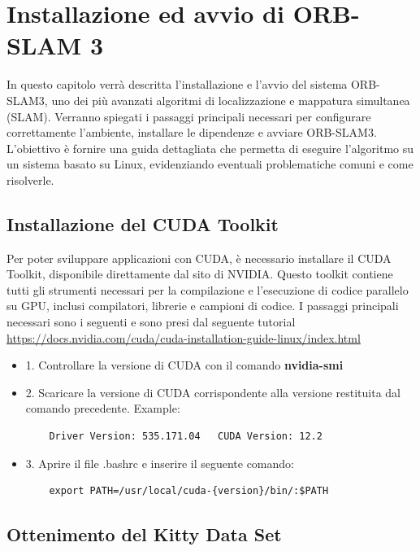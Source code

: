 \documentclass[12pt,a4paper]{report}
\begin{document}
\section{Installazione ed avvio di ORB-SLAM 3}

In questo capitolo verrà descritta l'installazione e l'avvio del sistema ORB-SLAM3, uno dei più avanzati algoritmi di localizzazione e mappatura simultanea (SLAM). Verranno spiegati i passaggi principali necessari per configurare correttamente l'ambiente, installare le dipendenze e avviare ORB-SLAM3. L'obiettivo è fornire una guida dettagliata che permetta di eseguire l'algoritmo su un sistema basato su Linux, evidenziando eventuali problematiche comuni e come risolverle.

\subsection{Installazione del CUDA Toolkit}

Per poter sviluppare applicazioni con CUDA, è necessario installare il CUDA Toolkit, disponibile direttamente dal sito di NVIDIA. Questo toolkit contiene tutti gli strumenti necessari per la compilazione e l'esecuzione di codice parallelo su GPU, inclusi compilatori, librerie e campioni di codice. I passaggi principali necessari sono i seguenti e sono presi dal seguente tutorial \url{https://docs.nvidia.com/cuda/cuda-installation-guide-linux/index.html}

\begin{itemize}
    \item 1. Controllare la versione di CUDA con il comando \textbf{nvidia-smi}
    \item 2. Scaricare la versione di CUDA corrispondente alla versione restituita dal comando precedente. Example: 
    \begin{verbatim}
    Driver Version: 535.171.04   CUDA Version: 12.2
    \end{verbatim}
    
    \item 3. Aprire il file .bashrc e inserire il seguente comando:
    \begin{verbatim}
    export PATH=/usr/local/cuda-{version}/bin/:$PATH
    \end{verbatim}
\end{itemize}

\subsection{Ottenimento del Kitty Data Set}
\end{document}
